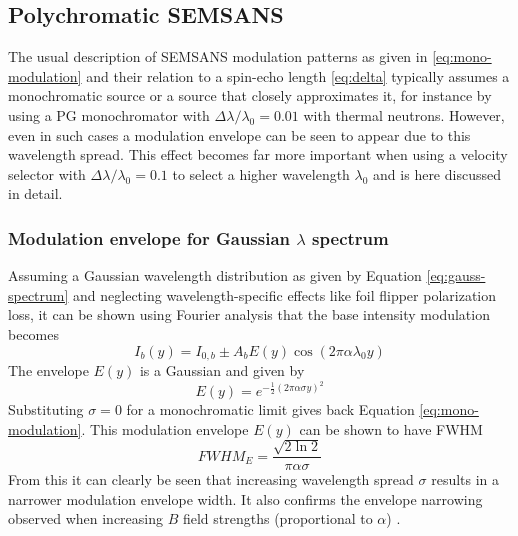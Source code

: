 \documentclass{article}
\begin{document}
\subsection{Polychromatic SEMSANS}
\label{c3.6}
The usual description of SEMSANS modulation patterns as given in \eqref{eq:mono-modulation} and their relation to a spin-echo length \eqref{eq:delta} typically assumes a monochromatic source or a source that closely approximates it, for instance by using a PG monochromator with $\Delta\lambda/\lambda_0 = 0.01$ with thermal neutrons. However, even in such cases a modulation envelope can be seen to appear \cite{bouwman2021} due to this wavelength spread. This effect becomes far more important when using a velocity selector with $\Delta\lambda/\lambda_0 = 0.1$ to select a higher wavelength $\lambda_0$ and is here discussed in detail.
\subsubsection{Modulation envelope for Gaussian $\lambda$ spectrum}
Assuming a Gaussian wavelength distribution as given by Equation \eqref{eq:gauss-spectrum} and neglecting wavelength-specific effects like foil flipper polarization loss, it can be shown using Fourier analysis that the base intensity modulation becomes
\begin{equation}
	I_b(y) = I_{0,b} \pm A_bE(y)\cos(2\pi\alpha\lambda_0y) \label{eq:poly-base-modulation}
\end{equation}
The envelope $E(y)$ is a Gaussian and given by
\begin{equation}
	E(y) = e^{-\frac{1}{2}\left(2\pi\alpha\sigma y\right)^2} \label{eq:poly-base-modulation-env}
\end{equation}
Substituting $\sigma=0$ for a monochromatic limit gives back Equation \eqref{eq:mono-modulation}. This modulation envelope $E(y)$ can be shown to have FWHM 
\begin{equation}
	FWHM_E = \frac{\sqrt{2\ln 2}}{\pi\alpha\sigma} \label{eq:poly-base-modulation-fwhm}
\end{equation}
From this it can clearly be seen that increasing wavelength spread $\sigma$ results in a narrower modulation envelope width. It also confirms the envelope narrowing observed when increasing $B$ field strengths (proportional to $\alpha$) \cite{bouwman2021}. 
\end{document}
